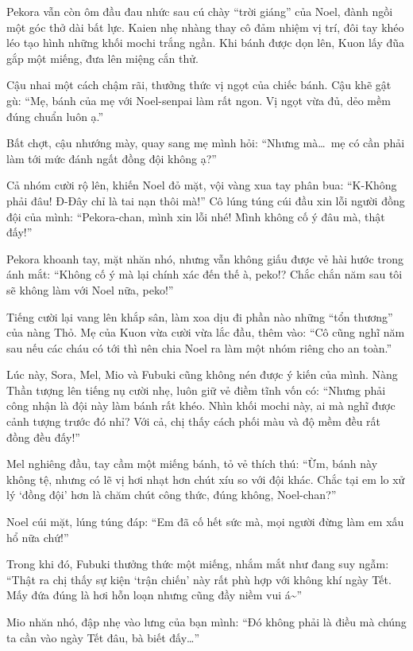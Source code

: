 \documentclass[../main.tex]{subfiles}
\begin{document}
\ct

Pekora vẫn còn ôm đầu đau nhức sau cú chày ``trời giáng'' của Noel, đành ngồi một góc thở dài bất lực. Kaien nhẹ nhàng thay cô đảm nhiệm vị trí, đôi tay khéo léo tạo hình những khối mochi trắng ngần. Khi bánh được dọn lên, Kuon lấy đũa gắp một miếng, đưa lên miệng cắn thử.

Cậu nhai một cách chậm rãi, thưởng thức vị ngọt của chiếc bánh. Cậu khẽ gật gù: ``Mẹ, bánh của mẹ với Noel-senpai làm rất ngon. Vị ngọt vừa đủ, dẻo mềm đúng chuẩn luôn ạ.''

Bất chợt, cậu nhướng mày, quay sang mẹ mình hỏi: ``Nhưng mà\dots\ mẹ có cần phải làm tới mức đánh ngất đồng đội không ạ?''

Cả nhóm cười rộ lên, khiến Noel đỏ mặt, vội vàng xua tay phân bua: ``K-Không phải đâu! Đ-Đây chỉ là tai nạn thôi mà!'' Cô lúng túng cúi đầu xin lỗi người đồng đội của mình: ``Pekora-chan, mình xin lỗi nhé! Mình không cố ý đâu mà, thật đấy!''

Pekora khoanh tay, mặt nhăn nhó, nhưng vẫn không giấu được vẻ hài hước trong ánh mắt: ``Không cố ý mà lại chính xác đến thế à, peko!? Chắc chắn năm sau tôi sẽ không làm với Noel nữa, peko!''

Tiếng cười lại vang lên khắp sân, làm xoa dịu đi phần nào những ``tổn thương'' của nàng Thỏ. Mẹ của Kuon vừa cười vừa lắc đầu, thêm vào: ``Cô cũng nghĩ năm sau nếu các cháu có tới thì nên chia Noel ra làm một nhóm riêng cho an toàn.''

Lúc này, Sora, Mel, Mio và Fubuki cũng không nén được ý kiến của mình. Nàng Thần tượng lên tiếng nụ cười nhẹ, luôn giữ vẻ điềm tĩnh vốn có: ``Nhưng phải công nhận là đội này làm bánh rất khéo. Nhìn khối mochi này, ai mà nghĩ được cảnh tượng trước đó nhỉ? Với cả, chị thấy cách phối màu và độ mềm đều rất đồng đều đấy!''

Mel nghiêng đầu, tay cầm một miếng bánh, tỏ vẻ thích thú: ``Ừm, bánh này không tệ, nhưng có lẽ vị hơi nhạt hơn chút xíu so với đội khác. Chắc tại em lo xử lý `đồng đội' hơn là chăm chút công thức, đúng không, Noel-chan?''

Noel cúi mặt, lúng túng đáp: ``Em đã cố hết sức mà, mọi người đừng làm em xấu hổ nữa chứ!''

Trong khi đó, Fubuki thưởng thức một miếng, nhắm mắt như đang suy ngẫm: ``Thật ra chị thấy sự kiện `trận chiến' này rất phù hợp với không khí ngày Tết. Mấy đứa đúng là hơi hỗn loạn nhưng cũng đầy niềm vui á\~{}''

Mio nhăn nhó, đập nhẹ vào lưng của bạn mình: ``Đó không phải là điều mà chúng ta cần vào ngày Tết đâu, bà biết đấy\dots''
\end{document}
